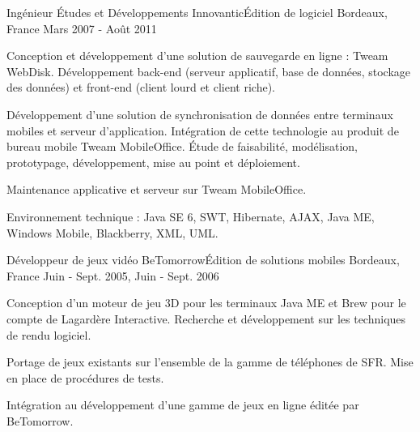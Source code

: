 \begin{cventries}
  \cventry
    {Ingénieur Études et Développements}
    {Innovantic{\enskip\cdotp\enskip}Édition de logiciel}
    {Bordeaux, France}
    {Mars 2007 - Août 2011}
    {
      \begin{cvitems}
        \item {Conception et développement d'une solution de sauvegarde en ligne : Tweam WebDisk. Développement back-end (serveur applicatif, base de données, stockage des données) et front-end (client lourd et client riche).}
        \item {Développement d'une solution de synchronisation de données entre terminaux mobiles et serveur d'application. Intégration de cette technologie au produit de bureau mobile Tweam MobileOffice. Étude de faisabilité, modélisation, prototypage, développement, mise au point et déploiement.}
        \item {Maintenance applicative et serveur sur Tweam MobileOffice.}
        \item {Environnement technique : Java SE 6, SWT, Hibernate, AJAX, Java ME, Windows Mobile, Blackberry, XML, UML.}
      \end{cvitems}
    }

  \cventry
    {Développeur de jeux vidéo}
    {BeTomorrow{\enskip\cdotp\enskip}Édition de solutions mobiles}
    {Bordeaux, France}
    {Juin - Sept. 2005, Juin - Sept. 2006}
    {
      \begin{cvitems}
        \item {Conception d'un moteur de jeu 3D pour les terminaux Java ME et Brew pour le compte de Lagardère Interactive. Recherche et développement sur les techniques de rendu logiciel. }
        \item {Portage de jeux existants sur l'ensemble de la gamme de téléphones de SFR. Mise en place de procédures de tests.}
        \item {Intégration au développement d'une gamme de jeux en ligne éditée par BeTomorrow.}
      \end{cvitems}
    }

\end{cventries}
